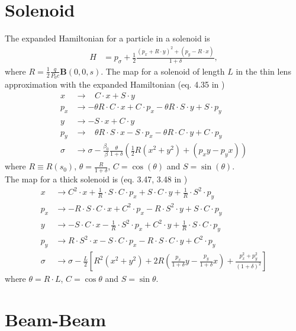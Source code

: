 \documentclass[english]{article}
\begin{document}
\section{Solenoid}
The expanded Hamiltonian for a particle in a solenoid is
\begin{align*}
  H &= p_\sigma+\frac{1}{2}\frac{(p_x+R\cdot y)^2+(p_y-R\cdot x)}{1+\delta},
\end{align*}
where $R=\frac{1}{2}\frac{q}{P_0c}\mathbf{B}(0,0,s)$. The map for a solenoid 
of length $L$ in the thin lens approximation with the expanded 
Hamiltonian (eq. 4.35 in \cite{heinemann95})
\begin{align*}
  x   &\to \,\,\,\,\, C\cdot x + S\cdot y \\
  p_x &\to -\theta R\cdot C \cdot x+C\cdot p_x
        -\theta R\cdot S\cdot y+S\cdot p_y \\
  y   &\to -S\cdot x + C\cdot y \\
  p_y &\to \,\,\,\,\, \theta R\cdot S\cdot x - S\cdot p_x 
  - \theta R\cdot C \cdot y + C\cdot p_y \\
  \sigma &\to \sigma - \frac{\beta_0}{\beta}
  \frac{\theta}{1+\delta} \left(\frac{1}{2}
  R (x^2 + y^2) + (p_xy - p_yx)\right)
\end{align*}
where $R\equiv R(s_0)$, $\theta=\frac{R}{1+\delta}$, 
$C=\cos(\theta)$ and $S=\sin(\theta)$.\\[0.5em]
The map for a thick solenoid is (eq. 3.47, 3.48 in \cite{ripken85}) 
\begin{align*}
    x &\to C^2 \cdot x+\frac{1}{R}\cdot S\cdot C\cdot p_x+S\cdot C\cdot y
    + \frac{1}{R}\cdot S^2 \cdot p_y \\
    p_x &\to -R\cdot S\cdot C\cdot x + C^2\cdot p_x
    -R\cdot S^2\cdot y + S\cdot C\cdot p_y \\
    y &\to -S\cdot C\cdot x -\frac{1}{R}\cdot S^2 \cdot p_x
    +C^2\cdot y + \frac{1}{R}\cdot S\cdot C\cdot p_y \\
    p_y &\to R\cdot S^2\cdot x -S\cdot C\cdot p_x
    -R\cdot S\cdot C\cdot y + C^2\cdot p_y \\
    \sigma &\to \sigma - \frac{L}{2} \left[R^2(x^2+y^2)+2R\left(
    \frac{p_x}{1+\delta}y - \frac{p_y}{1+\delta}x\right) 
    + \frac{p_x^2+p_y^2}{(1+\delta)^2} \right]
\end{align*}
where $\theta=R\cdot L$, $C=\cos\theta$ and $S=\sin\theta$.


\section{Beam-Beam}
\end{document}
